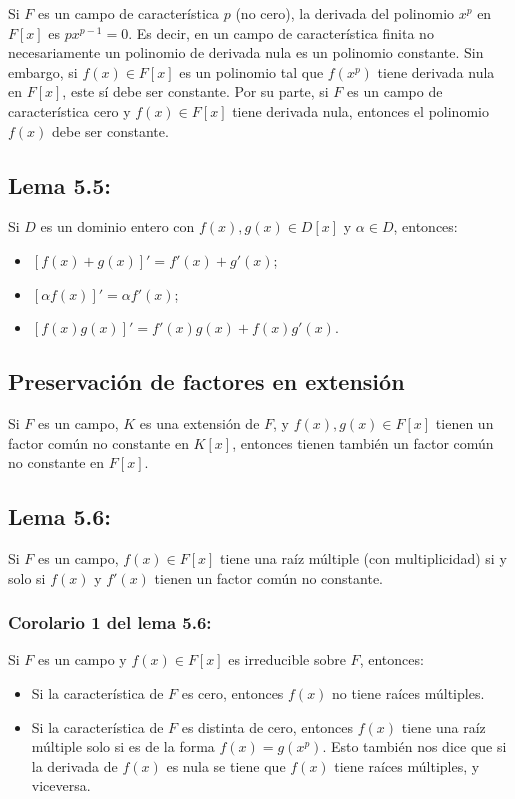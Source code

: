 \documentclass{article}
\begin{document}
Si $F$ es un campo de característica $p$ (no cero), la derivada del polinomio $x^p$ en $F[x]$ es $px^{p-1}=0$. Es decir, en un campo de característica finita no necesariamente  un polinomio de derivada nula es un polinomio constante. Sin embargo, si $f(x)\in F[x]$ es un polinomio tal que $f(x^p)$ tiene derivada nula en $F[x]$, este sí debe ser constante. Por su parte, si $F$ es un campo de característica cero y $f(x)\in F[x]$ tiene derivada nula, entonces el polinomio $f(x)$ debe ser constante.

\subsection*{\color{blue} Lema 5.5:}

Si $D$ es un dominio entero con $f(x),g(x)\in D[x]$ y $\alpha\in D$, entonces:
\begin{itemize}
\item $[f(x)+g(x)]'=f'(x)+g'(x)$;
\item $[\alpha f(x)]'=\alpha f'(x)$;
\item $[f(x)g(x)]'=f'(x)g(x)+f(x)g'(x)$.
\end{itemize}

\subsection*{\color{purple} Preservación de factores en extensión}

Si $F$ es un campo, $K$ es una extensión de $F$, y $f(x),g(x)\in F[x]$ tienen un factor común no constante en $K[x]$, entonces tienen también un factor común no constante en $F[x]$.

\subsection*{\color{blue} Lema 5.6:}

Si $F$ es un campo, $f(x)\in F[x]$ tiene una raíz múltiple (con multiplicidad) si y solo si $f(x)$ y $f'(x)$ tienen un factor común no constante.

\subsubsection*{\color{blue} Corolario 1 del lema 5.6:}

Si $F$ es un campo y $f(x)\in F[x]$ es irreducible sobre $F$, entonces:
\begin{itemize}
\item Si la característica de $F$ es cero, entonces $f(x)$ no tiene raíces múltiples.

\item Si la característica de $F$ es distinta de cero, entonces $f(x)$ tiene una raíz múltiple solo si es de la forma $f(x)=g(x^p)$. Esto también nos dice que si la derivada de $f(x)$ es nula se tiene que $f(x)$ tiene raíces múltiples, y viceversa.
\end{itemize}
\end{document}
